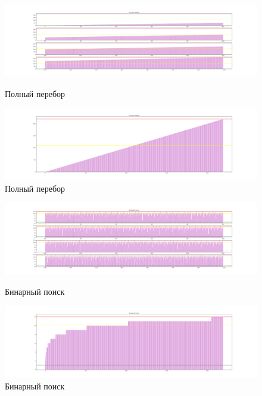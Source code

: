 \begin{landscape}
	\begin{figure}[H]
		\centering
		\includegraphics[width=0.95\linewidth]{assets/brute_force_keys.png}
		\caption{Полный перебор}
		\label{fig:brute_cmps}
		\centering
		\includegraphics[width=0.95\linewidth]{assets/brute_force_cmps.png}
		\caption{Полный перебор}
		\label{fig:brute_keys}
	\end{figure}
\end{landscape}

\begin{landscape}
	\begin{figure}[H]
		\centering
		\includegraphics[width=0.95\linewidth]{assets/binary_search_keys.png}
		\caption{Бинарный поиск}
		\label{fig:binary_cmps}
		
		\centering
		\includegraphics[width=0.95\linewidth]{assets/binary_search_cmps.png}
		\caption{Бинарный поиск}
		\label{fig:binary_keys}
	\end{figure}
\end{landscape}


